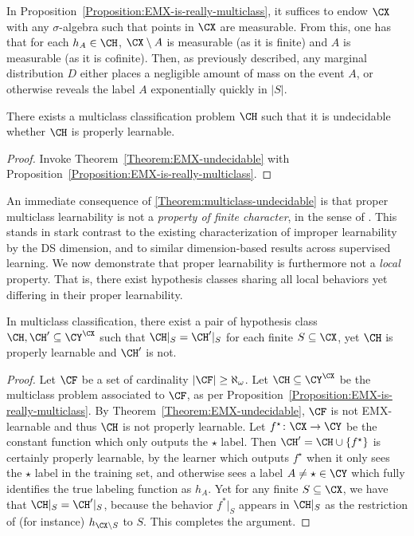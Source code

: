 \documentclass[11pt]{article}
\begin{document}
\vspace{0.04 cm}
\begin{remark}
In Proposition~\ref{Proposition:EMX-is-really-multiclass}, it suffices to endow $\CX$ with any $\sigma$-algebra such that points in $\CX$ are measurable. From this, one has that for each $h_A \in \CH$, $\CX \setminus A$ is measurable (as it is finite) and $A$ is measurable (as it is cofinite). Then, as previously described, any marginal distribution $D$ either places a negligible amount of mass on the event $A$, or otherwise reveals the label $A$ exponentially quickly in $|S|$. 
\end{remark}
\vspace{0.04 cm}

\begin{theorem}\label{Theorem:multiclass-undecidable}
There exists a multiclass classification problem $\CH$ such that it is undecidable whether $\CH$ is properly learnable. 
\end{theorem}
\begin{proof}
Invoke Theorem~\ref{Theorem:EMX-undecidable} with Proposition~\ref{Proposition:EMX-is-really-multiclass}. 
\end{proof}

An immediate consequence of \cref{Theorem:multiclass-undecidable} is that proper multiclass learnability is not a \emph{property of finite character}, in the sense of \citet{ben2019learnability}. This stands in stark contrast to the existing characterization of improper learnability by the DS dimension, and to similar dimension-based results across supervised learning. We now demonstrate that proper learnability is furthermore not a \emph{local} property. That is, there exist hypothesis classes sharing all local behaviors yet differing in their proper learnability. 

\begin{theorem}\label{Theorem:obstruction-local}
In multiclass classification, there exist a pair of hypothesis class $\CH, \CH' \subseteq \CY^\CX$ such that $\CH|_S = \CH'|_S$ for each finite $S \subseteq \CX$, yet $\CH$ is properly learnable and $\CH'$ is not. 
\end{theorem}
\begin{proof}
Let $\CF$ be a set of cardinality $|\CF| \geq \aleph_\omega$. Let $\CH \subseteq \CY^\CX$ be the multiclass problem associated to $\CF$, as per Proposition~\ref{Proposition:EMX-is-really-multiclass}. By Theorem~\ref{Theorem:EMX-undecidable}, $\CF$ is not EMX-learnable and thus $\CH$ is not properly learnable. Let $f^\star \colon \CX \to \CY$ be the constant function which only outputs the $\star$ label. Then $\CH' = \CH \cup \{f^\star\}$ is certainly properly learnable, by the learner which outputs $f^\star$ when it only sees the $\star$ label in the training set, and otherwise sees a label $A \neq \star \in \CY$ which fully identifies the true labeling function as $h_A$. Yet for any finite $S \subseteq \CX$, we have that $\CH|_S = \CH'|_S$, because the behavior $f^*|_S$ appears in $\CH|_S$ as the restriction of (for instance) $h_{\CX \setminus S}$ to $S$. This completes the argument. 
\end{proof}
\end{document}
